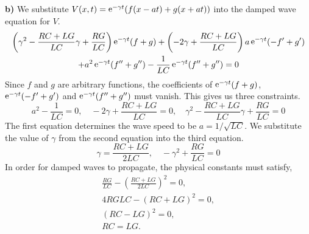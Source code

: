 {\begin{Solution}
  \textbf{b)}
  We substitute $V(x, t) = \mathop{\mathrm{e}}\nolimits^{-\gamma t} (f(x - a t) + g(x + a t))$ into the
  damped wave equation for $V$.
  \begin{multline*}
    \left( \gamma^2 - \frac{R C + L G}{L C} \gamma + \frac{R G}{L C} \right)
    \mathop{\mathrm{e}}\nolimits^{- \gamma t} (f + g)
    + \left( - 2 \gamma + \frac{R C + L G}{L C} \right) a 
    \mathop{\mathrm{e}}\nolimits^{- \gamma t} (-f' + g') \\
    + a^2 \mathop{\mathrm{e}}\nolimits^{-\gamma t} (f'' + g'')
    - \frac{1}{L C} \mathop{\mathrm{e}}\nolimits^{-\gamma t} (f'' + g'') = 0
  \end{multline*}
  Since $f$ and $g$ are arbitrary functions, the coefficients of 
  $\mathop{\mathrm{e}}\nolimits^{-\gamma t}(f + g)$, $\mathop{\mathrm{e}}\nolimits^{-\gamma t}(-f' + g')$ and
  $\mathop{\mathrm{e}}\nolimits^{-\gamma t}(f'' + g'')$ must vanish.  This gives us three constraints.
  \[
  a^2 - \frac{1}{L C} = 0, \quad
  - 2 \gamma + \frac{R C + L G}{L C} = 0, \quad
  \gamma^2 - \frac{R C + L G}{L C} \gamma + \frac{R G}{L C} = 0
  \]
  The first equation determines the wave speed to be $a = 1/ \sqrt{L C}$.
  We substitute the value of $\gamma$ from the second equation into the third 
  equation.
  \[
  \gamma = \frac{R C + L G}{2 L C},\quad
  -\gamma^2 + \frac{R G}{L C} = 0
  \]
  In order for damped waves to propagate, the physical constants must satisfy,
  \begin{gather*}
    \frac{R G}{L C} - \left( \frac{R C + L G}{2 L C} \right)^2 = 0, \\
    4 R G L C - (R C + L G)^2 = 0, \\
    (R C - L G)^2 = 0, \\
    \boxed{
      R C = L G.
      }
  \end{gather*}
\end{Solution}










\raggedbottom
}
